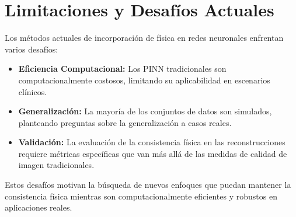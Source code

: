 \section{Limitaciones y Desafíos Actuales}

Los métodos actuales de incorporación de física en redes neuronales enfrentan varios desafíos:

\begin{itemize}
\item \textbf{Eficiencia Computacional:} Los PINN tradicionales son computacionalmente costosos, limitando su aplicabilidad en escenarios clínicos.

\item \textbf{Generalización:} La mayoría de los conjuntos de datos son simulados, planteando preguntas sobre la generalización a casos reales.

\item \textbf{Validación:} La evaluación de la consistencia física en las reconstrucciones requiere métricas específicas que van más allá de las medidas de calidad de imagen tradicionales.
\end{itemize}

Estos desafíos motivan la búsqueda de nuevos enfoques que puedan mantener la consistencia física mientras son computacionalmente eficientes y robustos en aplicaciones reales.